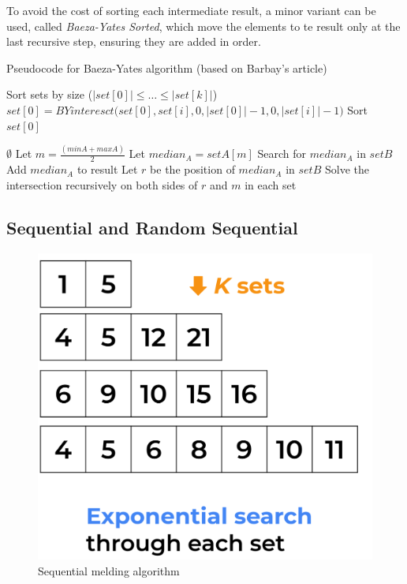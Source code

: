 To avoid the cost of sorting each intermediate result, a minor variant can be used, called \textit{Baeza-Yates Sorted}, which move the elements to te result only at the last recursive step, ensuring they are added in order.

\begin{algorithm}
    \captionsetup{labelsep=newline}
    \caption{Pseudocode for Baeza-Yates algorithm \label{alg:baezayates} (based on Barbay's article)}
    \begin{algorithmic}[1]
            \State Sort sets by size \big($\big|set[0]\big| \leq \ldots \leq \big|set[k]\big|$\big)
                \State $set[0] = BYinteresct\big(set[0], set[i], 0, \big|set[0]\big|-1, 0, \big|set[i]\big|-1\big)$
                \State Sort $set[0]$ 
            \EndFor
        \EndFunction

        \Statex

                \State\Return $\emptyset$
            \EndIf
            \State Let $m=\frac{(minA+maxA)}{2}$
            \State Let $median_A=setA[m]$
            \State Search for $median_A$ in $setB$
                \State Add $median_A$ to result
            \EndIf
            \State Let $r$ be the position of $median_A$ in $setB$
            \State Solve the intersection recursively on both sides of $r$ and $m$ in each set
        \EndFunction
    \end{algorithmic}
\end{algorithm}

\newpage

\subsection{Sequential and Random Sequential \label{sec:sequential}}

\begin{figure} %
    \centering
    \includegraphics[width=.4\textwidth]{imgs/sequential.png}
    \caption{Sequential melding algorithm\label{fig:sequential}}
\end{figure}

